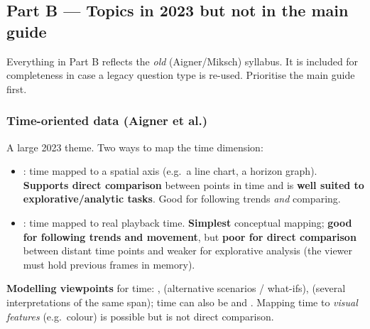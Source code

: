 \subsection{Part B --- Topics in 2023 but not in the main guide}
\begin{exambox}
Everything in Part B reflects the \textit{old} (Aigner/Miksch) syllabus. It is
included for completeness in case a legacy question type is re-used. Prioritise
the main guide first.
\end{exambox}

\subsubsection{Time-oriented data (Aigner et al.)}
A large 2023 theme. Two ways to map the time dimension:
\begin{keybox}
\begin{itemize}
  \item {}: time mapped to a spatial
        axis (e.g.\ a line chart, a horizon graph). \textbf{Supports direct
        comparison} between points in time and is \textbf{well suited to
        explorative/analytic tasks}. Good for following trends \emph{and}
        comparing.
  \item {}: time mapped to real
        playback time. \textbf{Simplest} conceptual mapping; \textbf{good for
        following trends and movement}, but \textbf{poor for direct comparison}
        between distant time points and weaker for explorative analysis (the
        viewer must hold previous frames in memory).
\end{itemize}
\end{keybox}
\textbf{Modelling viewpoints} for time: , 
(alternative scenarios / what-ifs),  (several
interpretations of the same span); time can also be  and
. Mapping time to \emph{visual features}
(e.g.\ colour) is possible but is not direct comparison.
